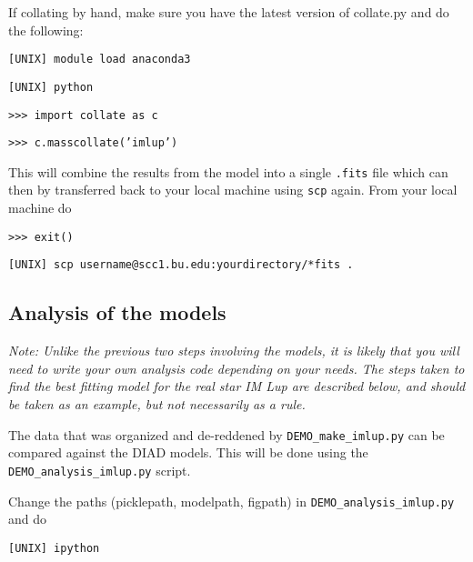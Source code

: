 \documentclass{article}
\begin{document}
\noindent If collating by hand, make sure you have the latest version of collate.py and do the following:


\vspace{2mm}
\texttt{[UNIX] module load anaconda3}
\vspace{2mm}

\vspace{2mm}
\texttt{[UNIX] python} 
\vspace{2mm}

\vspace{2mm}
\texttt{>>> import collate as c}

\texttt{>>> c.masscollate('imlup')}
\vspace{2mm}

\noindent This will combine the results from the model into a single  \texttt{.fits} file which can then by transferred back to your local machine using \texttt{scp} again.  From your local machine do

\vspace{2mm}
\texttt{>>> exit()}
\vspace{2mm}

\vspace{2mm}
\texttt{[UNIX] scp username@scc1.bu.edu:yourdirectory/*fits .}
\vspace{2mm}


\subsection{Analysis of the models}

\textit{Note: Unlike the previous two steps involving the models, it is likely that you will need to write your own analysis code depending on your needs. The steps taken to find the best fitting model for the real star IM Lup are described below, and should be taken as an example, but not necessarily as a rule.}
\vspace{2mm}

The data that was organized and de-reddened by \texttt{DEMO\_make\_imlup.py} can be compared against the DIAD models. This will be done using the \texttt{DEMO\_analysis\_imlup.py} script. 

Change the paths (picklepath, modelpath, figpath) in \texttt{DEMO\_analysis\_imlup.py} and do 

\vspace{2mm}
\texttt{[UNIX] ipython}
\vspace{2mm}
\end{document}
